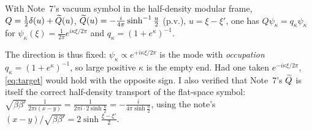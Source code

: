 \documentclass[11pt]{article}
\begin{document}
\begin{lemma}\label{lem:conv}
With Note~7's vacuum symbol in the half-density modular frame, \(Q=\frac12\delta(u)+\widetilde Q(u)\),
\(\widetilde Q(u)=-\frac i{4\pi}\sinh^{-1}\frac u2\) (p.v.), \(u=\xi-\xi'\), one has
\(Q\psi_\kappa=q_\kappa\psi_\kappa\) for \(\psi_\kappa(\xi)=\frac1{2\pi}e^{i\kappa\xi/2\pi}\) and
\(q_\kappa=(1+e^\kappa)^{-1}\).
\end{lemma}

\begin{remark}
The direction is thus fixed: \(\psi_\kappa\propto e^{+i\kappa\xi/2\pi}\) is the mode with
\emph{occupation} \(q_\kappa=(1+e^\kappa)^{-1}\), so large positive \(\kappa\) is the empty end.
Had one taken \(e^{-i\kappa\xi/2\pi}\), \eqref{eq:target} would hold with the opposite sign.  I also
verified that Note~7's \(\widetilde Q\) is itself the correct half-density transport of the flat-space
symbol: \(\sqrt{\beta\beta'}\,\frac1{2\pi i(x-y)}=\frac1{2\pi i\cdot2\sinh\frac u2}
=-\frac i{4\pi\sinh\frac u2}\), using the note's \((x-y)/\sqrt{\beta\beta'}=2\sinh\frac{\xi-\xi'}2\).
\end{remark}
\end{document}
